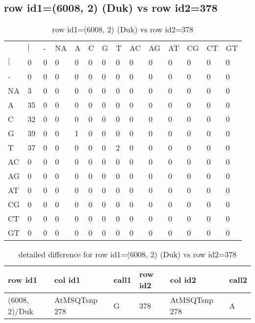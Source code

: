 \subsection{row id1=(6008, 2) (Duk) vs row id2=378}
\begin{center}
\begin{longtable}{|l|l|l|l|l|l|l|l|l|l|l|l|l|l|}
\caption{row id1=(6008, 2) (Duk) vs row id2=378} \label{table_dm8}\\
\hline
\\
\hline
&$|$&-&NA&A&C&G&T&AC&AG&AT&CG&CT&GT\\
$|$&0&0&0&0&0&0&0&0&0&0&0&0&0\\
-&0&0&0&0&0&0&0&0&0&0&0&0&0\\
NA&3&0&0&0&0&0&0&0&0&0&0&0&0\\
A&35&0&0&0&0&0&0&0&0&0&0&0&0\\
C&32&0&0&0&0&0&0&0&0&0&0&0&0\\
G&39&0&0&1&0&0&0&0&0&0&0&0&0\\
T&37&0&0&0&0&0&2&0&0&0&0&0&0\\
AC&0&0&0&0&0&0&0&0&0&0&0&0&0\\
AG&0&0&0&0&0&0&0&0&0&0&0&0&0\\
AT&0&0&0&0&0&0&0&0&0&0&0&0&0\\
CG&0&0&0&0&0&0&0&0&0&0&0&0&0\\
CT&0&0&0&0&0&0&0&0&0&0&0&0&0\\
GT&0&0&0&0&0&0&0&0&0&0&0&0&0\\
\hline
\end{longtable}
\end{center}

\begin{center}
\begin{longtable}{|l|l|l|l|l|l|}
\caption{detailed difference for row id1=(6008, 2) (Duk) vs row id2=378} \label{table_dm9}\\
\hline
row id1&col id1&call1&row id2&col id2&call2\\
\hline
(6008, 2)/Duk&AtMSQTsnp 278&G&378&AtMSQTsnp 278&A\\
\hline
\end{longtable}
\end{center}

